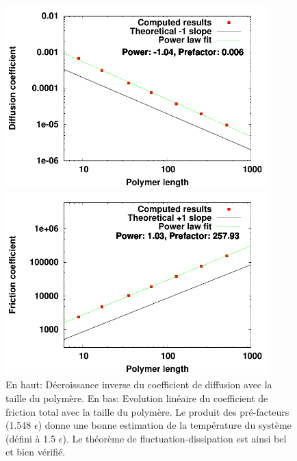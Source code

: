 \newpage

\begin{figure}[H]
\begin{center}
\includegraphics[width=0.9\textwidth]{diffusioncoefficient.pdf}

\includegraphics[width=0.9\textwidth]{penteforce.pdf}

\caption[Résultats numériques: évolution des coefficients de diffusion et de friction]{En haut: Décroissance inverse du coefficient de diffusion avec la taille du polymère. En bas: Evolution linéaire du coefficient de friction total avec la taille du polymère.  Le produit des pré-facteurs (1.548 $\epsilon$) donne une bonne estimation de la température du système (défini à 1.5 $\epsilon$). Le théorème de fluctuation-dissipation est ainsi bel et bien vérifié. }
\label{fluctu-dissip}
\end{center}
\end{figure}



